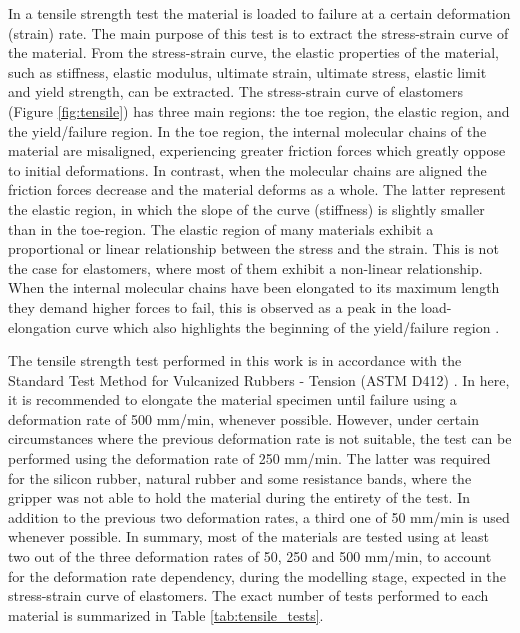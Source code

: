 In a tensile strength test the material is loaded to failure at a certain deformation (strain) rate. The main purpose of this test is to extract the stress-strain curve of the material. From the stress-strain curve, the elastic properties of the material, such as stiffness, elastic modulus, ultimate strain, ultimate stress, elastic limit and yield strength, can be extracted. The stress-strain curve of elastomers (Figure \ref{fig:tensile}) has three main regions: the toe region, the elastic region, and the yield/failure region. In the toe region, the internal molecular chains of the material are misaligned, experiencing greater friction forces which greatly oppose to initial deformations. In contrast, when the molecular chains are aligned the friction forces decrease and the material deforms as a whole. The latter represent the elastic region, in which the slope of the curve (stiffness) is slightly smaller than in the toe-region. The elastic region of many materials exhibit a proportional or linear relationship between the stress and the strain. This is not the case for elastomers, where most of them exhibit a non-linear relationship. When the internal molecular chains have been elongated to its maximum length they demand higher forces to fail, this is observed as a peak in the load-elongation curve which also highlights the beginning of the yield/failure region \cite{Bauman2008}.

The tensile strength test performed in this work is in accordance with the Standard Test Method for Vulcanized Rubbers - Tension (ASTM D412) \cite{astmd412}. In here, it is recommended to elongate the material specimen until failure using a deformation rate of 500 mm/min, whenever possible. However, under certain circumstances where the previous deformation rate is not suitable, the test can be performed using the deformation rate of 250 mm/min. The latter was required for the silicon rubber, natural rubber and some resistance bands, where the gripper was not able to hold the material during the entirety of the test. In addition to the previous two deformation rates, a third one of 50 mm/min is used whenever possible. In summary, most of the materials are tested using at least two out of the three deformation rates of 50, 250 and 500 mm/min, to account for the deformation rate dependency, during the modelling stage, expected in the stress-strain curve of elastomers. The exact number of tests performed to each material is summarized in Table \ref{tab:tensile_tests}.

